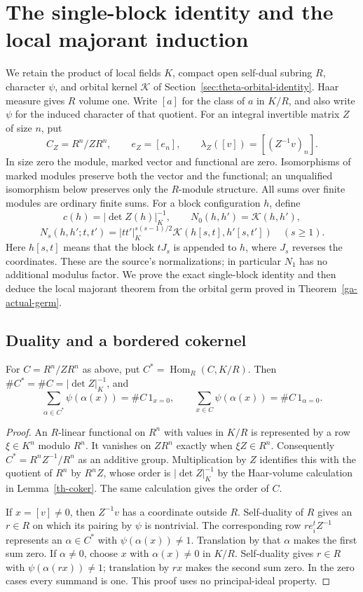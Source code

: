 \section{The single-block identity and the local majorant induction}
\label{tp-section}

We retain the product of local fields $K$, compact open self-dual
subring $R$, character $\psi$, and orbital kernel $\mathcal K$ of
Section~\ref{sec:theta-orbital-identity}. Haar measure gives $R$
volume one. Write $[a]$ for the class of $a$ in $K/R$, and also
write $\psi$ for the induced character of that quotient. For an
integral invertible matrix $Z$ of size $n$, put
\[
 C_Z=R^n/ZR^n,\qquad e_Z=[e_n],\qquad
 \lambda_Z([v])=[(Z^{-1}v)_n].
\]
In size zero the module, marked vector and functional are zero.
Isomorphisms of marked modules preserve both the vector and the
functional; an unqualified isomorphism below preserves only the
$R$-module structure. All sums over finite modules are ordinary
finite sums. For a block configuration $h$, define
\[
 c(h)=|\det Z(h)|_K^{-1},\qquad N_0(h,h')=\mathcal K(h,h'),
\]
\[
 N_s(h,h';t,t')=|tt'|_K^{s(s-1)/2}
           \mathcal K(h[s,t],h'[s,t'])\quad(s\ge1).
\]
Here $h[s,t]$ means that the block $tJ_s$ is appended to $h$,
where $J_s$ reverses the coordinates. These are the source's
normalizations\cite{alpo-uniform-source}; in particular $N_1$ has no additional modulus
factor. We prove the exact single-block identity and then deduce
the local majorant theorem from the orbital germ proved in
Theorem~\ref{ga-actual-germ}.

\subsection{Duality and a bordered cokernel}

\begin{lemma}\label{tp-dual}
For $C=R^n/ZR^n$ as above, put $C^*=\operatorname{Hom}_R(C,K/R)$.
Then $\#C^*=\#C=|\det Z|_K^{-1}$, and
\[
 \sum_{\alpha\in C^*}\psi(\alpha(x))
       =\#C\,1_{x=0},\qquad
 \sum_{x\in C}\psi(\alpha(x))=\#C\,1_{\alpha=0}.
\]
\end{lemma}

\begin{proof}
An $R$-linear functional on $R^n$ with values in $K/R$ is
represented by a row $\xi\in K^n$ modulo $R^n$. It vanishes on
$ZR^n$ exactly when $\xi Z\in R^n$. Consequently
$C^*=R^nZ^{-1}/R^n$ as an additive group. Multiplication by $Z$
identifies this with the quotient of $R^n$ by $R^nZ$, whose
order is $|\det Z|_K^{-1}$ by the Haar-volume calculation in
Lemma~\ref{th-coker}. The same calculation gives the order of $C$.

If $x=[v]\ne0$, then $Z^{-1}v$ has a coordinate outside $R$.
Self-duality of $R$ gives an $r\in R$ on which its pairing by
$\psi$ is nontrivial. The corresponding row $r e_i^tZ^{-1}$
represents an $\alpha\in C^*$ with $\psi(\alpha(x))\ne1$.
Translation by that $\alpha$ makes the first sum zero. If
$\alpha\ne0$, choose $x$ with $\alpha(x)\ne0$ in $K/R$.
Self-duality gives $r\in R$ with $\psi(\alpha(rx))\ne1$;
translation by $rx$ makes the second sum zero. In the zero cases
every summand is one. This proof uses no principal-ideal property.
\end{proof}

